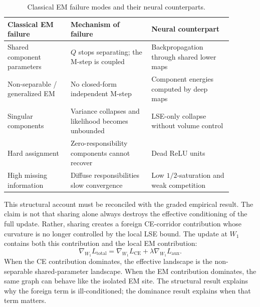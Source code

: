 \begin{table}[h]
\centering
\begin{tabular}{p{0.25\linewidth}p{0.32\linewidth}p{0.32\linewidth}}
\toprule
Classical EM failure & Mechanism of failure & Neural counterpart \\
\midrule
Shared component parameters & $Q$ stops separating; the M-step is coupled &
Backpropagation through shared lower maps \\
Non-separable / generalized EM & No closed-form independent M-step &
Component energies computed by deep maps \\
Singular components & Variance collapses and likelihood becomes unbounded &
LSE-only collapse without volume control \\
Hard assignment & Zero-responsibility components cannot recover &
Dead ReLU units \\
High missing information & Diffuse responsibilities slow convergence &
Low $1/2$-saturation and weak competition \\
\bottomrule
\end{tabular}
\caption{Classical EM failure modes and their neural counterparts.}
\label{tab:em-failures}
\end{table}

This structural account must be reconciled with the graded empirical result.
The claim is not that sharing alone always destroys the effective conditioning
of the full update. Rather, sharing creates a foreign CE-corridor contribution
whose curvature is no longer controlled by the local LSE bound. The update at
$W_1$ contains both this contribution and the local EM contribution:
\[
    \nabla_{W_1} L_{\mathrm{total}}
    =
    \nabla_{W_1} L_{\mathrm{CE}}
    +
    \lambda \nabla_{W_1}L_{\mathrm{aux}}.
\]
When the CE contribution dominates, the effective landscape is the
non-separable shared-parameter landscape. When the EM contribution dominates,
the same graph can behave like the isolated EM site. The structural result
explains why the foreign term is ill-conditioned; the dominance result
explains when that term matters.